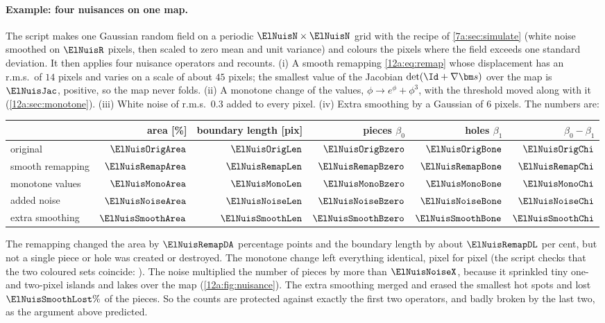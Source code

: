 \paragraph{Example: four nuisances on one map.} The script  makes one
Gaussian random field on a periodic $\ElNuisN\times\ElNuisN$ grid with the recipe of \cref{7a:sec:simulate}
(white noise smoothed on $\ElNuisR$ pixels, then scaled to zero mean and unit variance) and colours the
pixels where the field exceeds one standard deviation. It then applies four nuisance operators and recounts.
(i) A smooth remapping \eqref{12a:eq:remap} whose displacement has an r.m.s.\ of $14$ pixels and varies on a
scale of about $45$ pixels; the smallest value of the Jacobian $\det(\Id+\nabla\bm s)$ over the map is
$\ElNuisJac$, positive, so the map never folds. (ii) A monotone change of the values,
$\phi\to e^\phi+\phi^3$, with the threshold moved along with it (\cref{12a:sec:monotone}). (iii) White noise
of r.m.s.\ $0.3$ added to every pixel. (iv) Extra smoothing by a Gaussian of $6$ pixels. The numbers are:
\begin{center}
\small
\begin{tabular}{lrrrrr}
\toprule
 & area [\%] & boundary length [pix] & pieces $\beta_0$ & holes $\beta_1$ & $\beta_0-\beta_1$\\
\midrule
original            & $\ElNuisOrigArea$   & $\ElNuisOrigLen$   & $\ElNuisOrigBzero$   & $\ElNuisOrigBone$   & $\ElNuisOrigChi$\\
smooth remapping    & $\ElNuisRemapArea$  & $\ElNuisRemapLen$  & $\ElNuisRemapBzero$  & $\ElNuisRemapBone$  & $\ElNuisRemapChi$\\
monotone values     & $\ElNuisMonoArea$   & $\ElNuisMonoLen$   & $\ElNuisMonoBzero$   & $\ElNuisMonoBone$   & $\ElNuisMonoChi$\\
added noise         & $\ElNuisNoiseArea$  & $\ElNuisNoiseLen$  & $\ElNuisNoiseBzero$  & $\ElNuisNoiseBone$  & $\ElNuisNoiseChi$\\
extra smoothing     & $\ElNuisSmoothArea$ & $\ElNuisSmoothLen$ & $\ElNuisSmoothBzero$ & $\ElNuisSmoothBone$ & $\ElNuisSmoothChi$\\
\bottomrule
\end{tabular}
\end{center}
The remapping changed the area by $\ElNuisRemapDA$ percentage points and the boundary length by about $\ElNuisRemapDL$ per cent,
but not a single piece or hole was created or destroyed. The monotone change left everything identical, pixel for
pixel (the script checks that the two coloured sets coincide: \ElNuisMonoSame). The noise multiplied the
number of pieces by more than $\ElNuisNoiseX$, because it sprinkled tiny one- and two-pixel islands and lakes over the
map (\cref{12a:fig:nuisance}). The extra smoothing merged and erased the smallest hot spots and lost
$\ElNuisSmoothLost\%$ of the pieces. So the counts are protected against exactly the first two operators, and badly broken by
the last two, as the argument above predicted.

